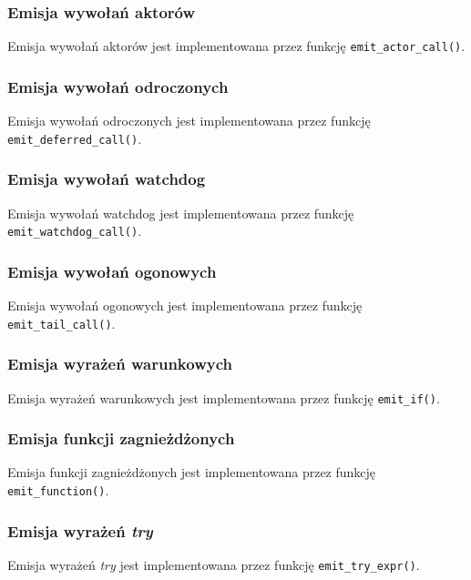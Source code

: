 \subsubsection{Emisja wywołań aktorów}

Emisja wywołań aktorów jest implementowana przez funkcję \texttt{emit\_actor\_call()}.

\subsubsection{Emisja wywołań odroczonych}

Emisja wywołań odroczonych jest implementowana przez funkcję \texttt{emit\_deferred\_call()}.

\subsubsection{Emisja wywołań watchdog}

Emisja wywołań watchdog jest implementowana przez funkcję \texttt{emit\_watchdog\_call()}.

\subsubsection{Emisja wywołań ogonowych}

Emisja wywołań ogonowych jest implementowana przez funkcję \texttt{emit\_tail\_call()}.

\subsubsection{Emisja wyrażeń warunkowych}

Emisja wyrażeń warunkowych jest implementowana przez funkcję \texttt{emit\_if()}.

\subsubsection{Emisja funkcji zagnieżdżonych}

Emisja funkcji zagnieżdżonych jest implementowana przez funkcję \texttt{emit\_function()}.

\subsubsection{Emisja wyrażeń \emph{try}}

Emisja wyrażeń \emph{try} jest implementowana przez funkcję \texttt{emit\_try\_expr()}.

